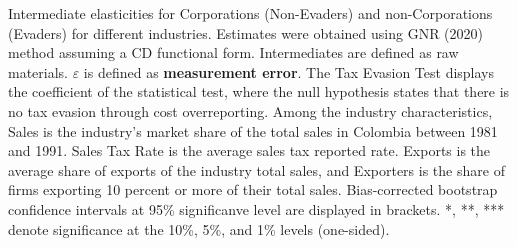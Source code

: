 \documentclass[
  12pt]{article}
\theoremstyle{definition}
\theoremstyle{remark}
\begin{document}
\begin{table}

\caption{\label{tbl-ielas}Intermediate elasticities for Corporations
(Non-Evaders) and non-Corporations (Evaders) for different industries.
Estimates were obtained using GNR (2020) method assuming a CD functional
form. Intermediates are defined as raw materials. \(\varepsilon\) is
defined as \textbf{measurement error}. The Tax Evasion Test displays the
coefficient of the statistical test, where the null hypothesis states
that there is no tax evasion through cost overreporting. Among the
industry characteristics, Sales is the industry's market share of the
total sales in Colombia between 1981 and 1991. Sales Tax Rate is the
average sales tax reported rate. Exports is the average share of exports
of the industry total sales, and Exporters is the share of firms
exporting 10 percent or more of their total sales. Bias-corrected
bootstrap confidence intervals at 95\% significanve level are displayed
in brackets. *, **, *** denote significance at the 10\%, 5\%, and 1\%
levels (one-sided).}

\centering{

}
\end{table}
\end{document}
